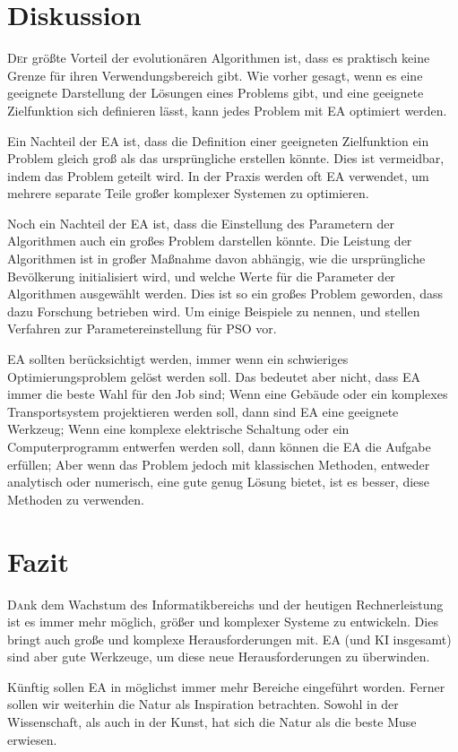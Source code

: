 \documentclass[twoside,twocolumn]{article}
\begin{document}

\section{Diskussion}
\lettrine[nindent=0em,lines=3]{D} er größte Vorteil der evolutionären Algorithmen ist, dass es praktisch keine Grenze für ihren Verwendungsbereich gibt. Wie vorher gesagt, wenn es eine geeignete Darstellung der Lösungen eines Problems gibt, und eine geeignete Zielfunktion sich definieren lässt, kann jedes Problem mit EA optimiert werden.\par
Ein Nachteil der EA ist, dass die Definition einer geeigneten Zielfunktion ein Problem gleich groß als das ursprüngliche erstellen könnte. Dies ist vermeidbar, indem das Problem geteilt wird. In der Praxis werden oft EA verwendet, um mehrere separate Teile großer komplexer Systemen zu optimieren.\par
Noch ein Nachteil der EA ist, dass die Einstellung des Parametern der Algorithmen auch ein großes Problem darstellen könnte. Die Leistung der Algorithmen ist in großer Maßnahme davon abhängig, wie die ursprüngliche Bevölkerung initialisiert wird, und welche Werte für die Parameter der Algorithmen ausgewählt werden. Dies ist so ein großes Problem geworden, dass dazu Forschung betrieben wird. Um einige Beispiele zu nennen, \cite{pso_tuning_a} und \cite{pso_tuning_c} stellen Verfahren zur Parametereinstellung für PSO vor.\par
EA sollten berücksichtigt werden, immer wenn ein schwieriges Optimierungsproblem gelöst werden soll. Das bedeutet aber nicht, dass EA immer die beste Wahl für den Job sind; Wenn eine Gebäude oder ein komplexes Transportsystem projektieren werden soll, dann sind EA eine geeignete Werkzeug; Wenn eine komplexe elektrische Schaltung oder ein Computerprogramm entwerfen werden soll, dann können die EA die Aufgabe erfüllen; Aber wenn das Problem jedoch mit klassischen Methoden, entweder analytisch oder numerisch, eine gute genug Lösung bietet, ist es besser, diese Methoden zu verwenden.


\section{Fazit}
\lettrine[nindent=0em,lines=3]{D} ank dem Wachstum des Informatikbereichs und der heutigen Rechnerleistung ist es immer mehr möglich, größer und komplexer Systeme zu entwickeln. Dies bringt auch große und komplexe Herausforderungen mit. EA (und KI insgesamt) sind aber gute Werkzeuge, um diese neue Herausforderungen zu überwinden.\par
Künftig sollen EA in möglichst immer mehr Bereiche eingeführt worden. Ferner sollen wir weiterhin die Natur als Inspiration betrachten. Sowohl in der Wissenschaft, als auch in der Kunst, hat sich die Natur als die beste Muse erwiesen.
\end{document}
